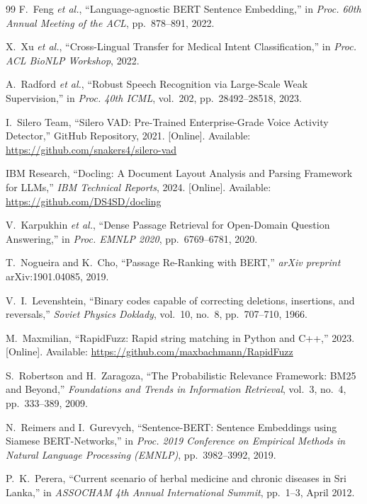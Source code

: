 \documentclass[12pt,a4paper]{report}
\begin{document}
\begin{thebibliography}{99}
F.~Feng \textit{et al.},
``Language-agnostic BERT Sentence Embedding,''
in \textit{Proc. 60th Annual Meeting of the ACL}, pp.~878--891, 2022.

X.~Xu \textit{et al.},
``Cross-Lingual Transfer for Medical Intent Classification,''
in \textit{Proc. ACL BioNLP Workshop}, 2022.

A.~Radford \textit{et al.},
``Robust Speech Recognition via Large-Scale Weak Supervision,''
in \textit{Proc. 40th ICML}, vol.~202, pp.~28492--28518, 2023.

I.~Silero Team,
``Silero VAD: Pre-Trained Enterprise-Grade Voice Activity Detector,''
GitHub Repository, 2021.
[Online]. Available: \url{https://github.com/snakers4/silero-vad}

IBM Research,
``Docling: A Document Layout Analysis and Parsing Framework for LLMs,''
\textit{IBM Technical Reports}, 2024.
[Online]. Available: \url{https://github.com/DS4SD/docling}

V.~Karpukhin \textit{et al.},
``Dense Passage Retrieval for Open-Domain Question Answering,''
in \textit{Proc. EMNLP 2020}, pp.~6769--6781, 2020.

T.~Nogueira and K.~Cho,
``Passage Re-Ranking with BERT,''
\textit{arXiv preprint} arXiv:1901.04085, 2019.

V.~I.~Levenshtein,
``Binary codes capable of correcting deletions, insertions, and reversals,''
\textit{Soviet Physics Doklady}, vol.~10, no.~8, pp.~707--710, 1966.

M.~Maxmilian,
``RapidFuzz: Rapid string matching in Python and C++,''
2023.
[Online]. Available: \url{https://github.com/maxbachmann/RapidFuzz}

S.~Robertson and H.~Zaragoza,
``The Probabilistic Relevance Framework: BM25 and Beyond,''
\textit{Foundations and Trends in Information Retrieval}, vol.~3, no.~4, pp.~333--389, 2009.

N.~Reimers and I.~Gurevych,
``Sentence-BERT: Sentence Embeddings using Siamese BERT-Networks,''
in \textit{Proc. 2019 Conference on Empirical Methods in Natural Language Processing (EMNLP)}, pp.~3982--3992, 2019.

P.~K.~Perera,
``Current scenario of herbal medicine and chronic diseases in Sri Lanka,''
in \textit{ASSOCHAM 4th Annual International Summit}, pp.~1--3, April 2012.

\end{thebibliography}
\end{document}
